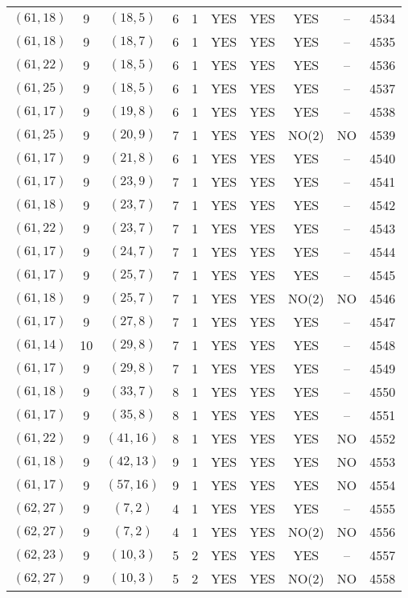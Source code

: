 \begin{longtable}{|c|c|c|c|c|c|c|c|c|c|}
$(61, 18)$ & 9 & $(18, 5)$ & 6 & 1 & YES & YES & YES & -- & 4534\\
$(61, 18)$ & 9 & $(18, 7)$ & 6 & 1 & YES & YES & YES & -- & 4535\\
$(61, 22)$ & 9 & $(18, 5)$ & 6 & 1 & YES & YES & YES & -- & 4536\\
$(61, 25)$ & 9 & $(18, 5)$ & 6 & 1 & YES & YES & YES & -- & 4537\\
$(61, 17)$ & 9 & $(19, 8)$ & 6 & 1 & YES & YES & YES & -- & 4538\\
$(61, 25)$ & 9 & $(20, 9)$ & 7 & 1 & YES & YES & NO(2) & NO & 4539\\
$(61, 17)$ & 9 & $(21, 8)$ & 6 & 1 & YES & YES & YES & -- & 4540\\
$(61, 17)$ & 9 & $(23, 9)$ & 7 & 1 & YES & YES & YES & -- & 4541\\
$(61, 18)$ & 9 & $(23, 7)$ & 7 & 1 & YES & YES & YES & -- & 4542\\
$(61, 22)$ & 9 & $(23, 7)$ & 7 & 1 & YES & YES & YES & -- & 4543\\
$(61, 17)$ & 9 & $(24, 7)$ & 7 & 1 & YES & YES & YES & -- & 4544\\
$(61, 17)$ & 9 & $(25, 7)$ & 7 & 1 & YES & YES & YES & -- & 4545\\
$(61, 18)$ & 9 & $(25, 7)$ & 7 & 1 & YES & YES & NO(2) & NO & 4546\\
$(61, 17)$ & 9 & $(27, 8)$ & 7 & 1 & YES & YES & YES & -- & 4547\\
$(61, 14)$ & 10 & $(29, 8)$ & 7 & 1 & YES & YES & YES & -- & 4548\\
$(61, 17)$ & 9 & $(29, 8)$ & 7 & 1 & YES & YES & YES & -- & 4549\\
$(61, 18)$ & 9 & $(33, 7)$ & 8 & 1 & YES & YES & YES & -- & 4550\\
$(61, 17)$ & 9 & $(35, 8)$ & 8 & 1 & YES & YES & YES & -- & 4551\\
$(61, 22)$ & 9 & $(41, 16)$ & 8 & 1 & YES & YES & YES & NO & 4552\\
$(61, 18)$ & 9 & $(42, 13)$ & 9 & 1 & YES & YES & YES & NO & 4553\\
$(61, 17)$ & 9 & $(57, 16)$ & 9 & 1 & YES & YES & YES & NO & 4554\\
$(62, 27)$ & 9 & $(7, 2)$ & 4 & 1 & YES & YES & YES & -- & 4555\\
$(62, 27)$ & 9 & $(7, 2)$ & 4 & 1 & YES & YES & NO(2) & NO & 4556\\
$(62, 23)$ & 9 & $(10, 3)$ & 5 & 2 & YES & YES & YES & -- & 4557\\
$(62, 27)$ & 9 & $(10, 3)$ & 5 & 2 & YES & YES & NO(2) & NO & 4558\\

\end{longtable}
